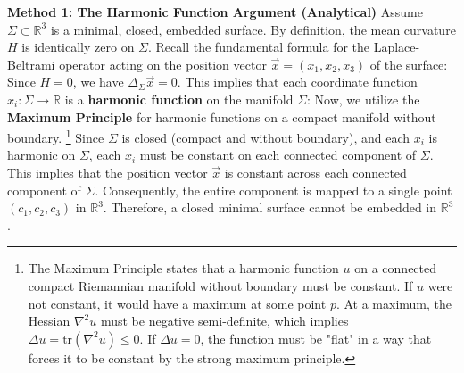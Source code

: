 \begin{solution}
\textbf{Method 1: The Harmonic Function Argument (Analytical)}
Assume $\Sigma \subset \mathbb{R}^3$ is a minimal, closed, embedded surface.
By definition, the mean curvature $H$ is identically zero on $\Sigma$.
Recall the fundamental formula for the Laplace-Beltrami operator acting on the position vector $\vec{x} = (x_1, x_2, x_3)$ of the surface:
Since $H = 0$, we have $\Delta_{\Sigma} \vec{x} = 0$. This implies that each coordinate function $x_i : \Sigma \to \mathbb{R}$ is a \textbf{harmonic function} on the manifold $\Sigma$:
Now, we utilize the \textbf{Maximum Principle} for harmonic functions on a compact manifold without boundary.
\footnote{The Maximum Principle states that a harmonic function $u$ on a connected compact Riemannian manifold without boundary must be constant. If $u$ were not constant, it would have a maximum at some point $p$. At a maximum, the Hessian $\nabla^2 u$ must be negative semi-definite, which implies $\Delta u = \text{tr}(\nabla^2 u) \le 0$. If $\Delta u = 0$, the function must be "flat" in a way that forces it to be constant by the strong maximum principle.}
Since $\Sigma$ is closed (compact and without boundary), and each $x_i$ is harmonic on $\Sigma$, each $x_i$ must be constant on each connected component of $\Sigma$.
This implies that the position vector $\vec{x}$ is constant across each connected component of $\Sigma$. Consequently, the entire component is mapped to a single point $(c_1, c_2, c_3)$ in $\mathbb{R}^3$.
Therefore, a closed minimal surface cannot be embedded in $\mathbb{R}^3$.


\end{solution}

